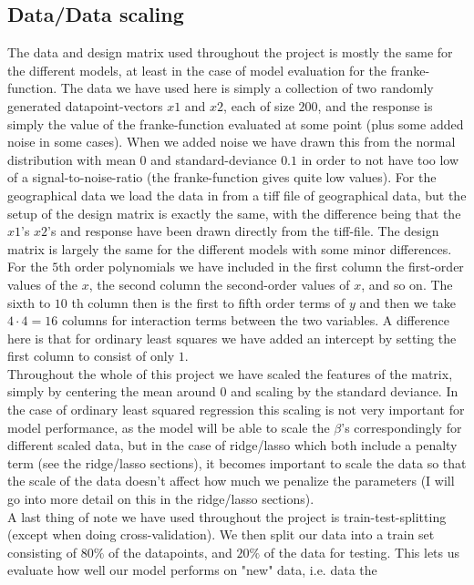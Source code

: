 \documentclass{article}
\begin{document}
\subsection{Data/Data scaling}
The data and design matrix used throughout the project is mostly the same for
the different models, at least in the case of model evaluation for the
franke-function. The data we have used here is simply a collection of two
randomly generated datapoint-vectors $x1$ and $x2$, each of size $200$, and the
response is simply the value of the franke-function evaluated at some point
(plus some added noise in some cases). When we added noise we have drawn this
from the normal distribution with mean $0$ and standard-deviance $0.1$ in order
to not have too low of a signal-to-noise-ratio (the franke-function gives quite
low values). For the geographical data we load the data in from a tiff file of
geographical data, but the setup of the design matrix is exactly the same, with
the difference being that the $x1$'s $x2$'s and response have been drawn directly from the
tiff-file. The design matrix is largely the same for the different models with
some minor differences.  For the $5$th order polynomials we have included in
the first column the first-order values of the $x$, the second column the
second-order values of $x$, and so on. The sixth to $10$ th column then is the
first to fifth order terms of $y$ and then we take $4 \cdot 4 = 16$ columns for
interaction terms between the two variables. A difference here is that for
ordinary least squares we have added an intercept by setting the first column to
consist of only $1$.
\\
Throughout the whole of this project we have scaled the
features of the matrix, simply by centering the mean around $0$ and scaling by
the standard deviance. In the case of ordinary least squared regression this
scaling is not very important for model performance, as the model will be able
to scale the $\beta$'s correspondingly for different scaled data, but in the
case of ridge/lasso which both include a penalty term (see the ridge/lasso
sections), it becomes important to scale the data so that the scale of the data
doesn't affect how much we penalize the parameters (I will go into more detail
on this in the ridge/lasso sections).
\\
A last thing of note we have used throughout the project is train-test-splitting
(except when doing cross-validation). We then split our data into a train set
consisting of $80\%$ of the datapoints, and $20\%$ of the data for testing.
This lets us evaluate how well our model performs on "new" data, i.e. data the
\end{document}
